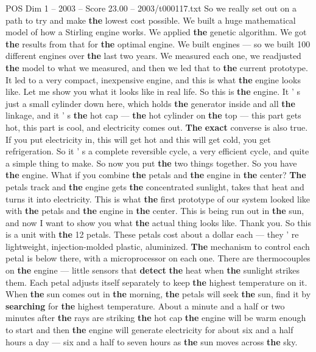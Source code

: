 \begin{textsample}{POS Dim 1 – 2003 – Score 23.00 – 2003/t000117.txt}
So we really set out on a path to try and make \textbf{the} lowest cost possible.
We built a huge mathematical model of how a Stirling engine works.
We applied \textbf{the} genetic algorithm.
We got \textbf{the} results from that for \textbf{the} optimal engine.
We built engines — so we built 100 different engines over \textbf{the} last two years.
We measured each one, we readjusted \textbf{the} model to what we measured, and then we led that to \textbf{the} current prototype.
It led to a very compact, inexpensive engine, and this is what \textbf{the} engine looks like.
Let me show you what it looks like in real life.
So this is \textbf{the} engine.
It ' s just a small cylinder down here, which holds \textbf{the} generator inside and all \textbf{the} linkage, and it ' s \textbf{the} hot cap — \textbf{the} hot cylinder on \textbf{the} top — this part gets hot, this part is cool, and electricity comes out. \textbf{The} \textbf{exact} converse is also true.
If you put electricity in, this will get hot and this will get cold, you get refrigeration.
So it ' s a complete reversible cycle, a very efficient cycle, and quite a simple thing to make.
So now you put \textbf{the} two things together.
So you have \textbf{the} engine.
What if you combine \textbf{the} petals and \textbf{the} engine in \textbf{the} center? \textbf{The} petals track and \textbf{the} engine gets \textbf{the} concentrated sunlight, takes that heat and turns it into electricity.
This is what \textbf{the} first prototype of our system looked like with \textbf{the} petals and \textbf{the} engine in \textbf{the} center.
This is being run out in \textbf{the} sun, and now I want to show you what \textbf{the} actual thing looks like.
Thank you.
So this is a unit with \textbf{the} 12 petals.
These petals cost about a dollar each — they ' re lightweight, injection-molded plastic, aluminized. \textbf{The} mechanism to control each petal is below there, with a microprocessor on each one.
There are thermocouples on \textbf{the} engine — little sensors that \textbf{detect} \textbf{the} heat when \textbf{the} sunlight strikes them.
Each petal adjusts itself separately to keep \textbf{the} highest temperature on it.
When \textbf{the} sun comes out in \textbf{the} morning, \textbf{the} petals will seek \textbf{the} sun, find it by \textbf{searching} for \textbf{the} highest temperature.
About a minute and a half or two minutes after \textbf{the} rays are striking \textbf{the} hot cap \textbf{the} engine will be warm enough to start and then \textbf{the} engine will generate electricity for about six and a half hours a day — six and a half to seven hours as \textbf{the} sun moves across \textbf{the} sky.

\end{textsample}
